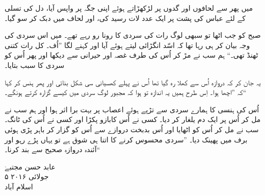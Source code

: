 \documentclass{article}
\begin{document}
میں پھر سے لحافوں اور گدوں پر لڑکھڑاتے ہوئے اپنی جگہ پر واپس آیا، دل کی تسلی کے لئے عباس کی پشت پر ایک عدد لات رسید کی، اور لحاف میں دبک کر سو گیا۔

صبح کو جب اٹھا تو سبھی لوگ رات کی سردی کا رونا رو رہے تھے۔ میں اس سردی کی وجہ بیان کر ہی رہا تھا کہ اسّد انگڑائی لیتے ہوئے آیا اور کہنے لگا ''اُف۔ کل رات کتنی ٹھنڈ تھی۔`` ہم سب نے مڑ کر اُس کی طرف غصہ اور حیرانی سے دیکھا اور پھر اُس کو سردی کا سبب بتایا۔

یہ جان کر کہ دروازہ اُس سے کھلا رہ گیا تھا اُس نے پہلے کھسیانی سی شکل بنائی اور پھر ہنس کر کہا کہ ''اچھا ہوا۔ اِس طرح ہمیں یہ اندازہ تو ہوا کہ مجبور لوگ سردی میں کیسے گزارہ کرتے ہونگے۔``

اُس کی ہنسی کا ہمارے سردی سے تڑپے ہوئے اعصاب پر بہت برا اثر ہوا اور ہم سب نے مل کر اُس پر ایک دم یلغار کر دیا۔ کسی نے اُس کابازو پکڑا اور کسی نے اُس کی ٹانگ۔ سب نے مل کر اُس کو اٹھایا اور اُس بدبخت دروازے سے اُس کو گزار کر باہر پڑی ہوئی برف میں پھینک دیا۔ ''سردی محسوس کرنے کا اتنا ہی شوق ہے تو یہاں پڑے رہو اور آئندہ دروازہ صحیح سے بند کرنا۔``


\vspace{\baselineskip}
\begin{flushleft}
   عابد حسن مجتبےٰ\\
   ۵ جولائی ۲۰۱۶\\
   اسلام آباد
\end{flushleft}
\end{document}
